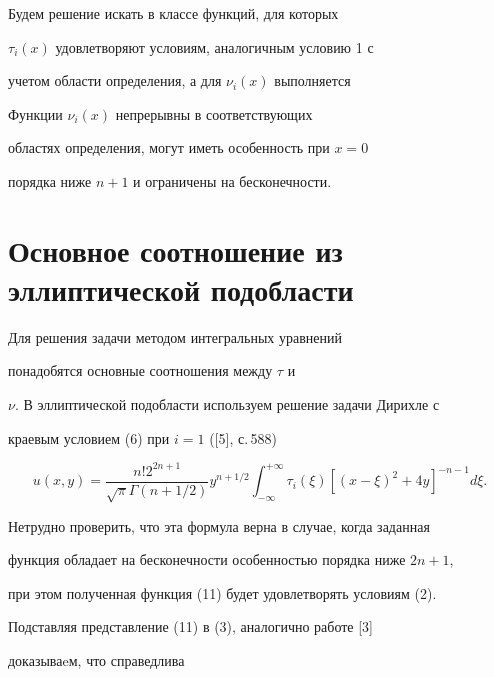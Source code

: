 Будем решение искать в классе функций, для которых


$\tau_i(x) $ удовлетворяют условиям, аналогичным условию 1 с


учетом области определения, а для $\nu_i(x)$ выполняется





\begin{cond}


Функции $\nu_i(x)$ непрерывны в соответствующих


областях определения, могут иметь особенность при $x=0$


порядка ниже $n+1$ и ограничены на бесконечности.


\end{cond}





\section{Основное соотношение из эллиптической подобласти}





Для решения задачи методом интегральных уравнений


понадобятся основные соотношения между $\tau$ и


$\nu$. В эллиптической подобласти используем решение задачи Дирихле с


краевым условием (6) при $i=1$ ([5], с.\,588)


\begin{equation}


u(x,y) = \frac{n!2^{2n+1}}{\sqrt{\pi}\Gamma(n+1/2)}y^{n+1/2}


\int_{-\infty}^{+\infty} \tau_i(\xi)[(x-\xi)^2+4y]^{-n-1}d\xi.


\end{equation}





Нетрудно проверить, что эта формула верна в случае, когда заданная


функция обладает на бесконечности особенностью порядка ниже $2n+1$,


при этом полученная функция (11) будет удовлетворять условиям (2).


Подставляя представление (11) в (3), аналогично работе [3]


доказываeм, что справедлива





